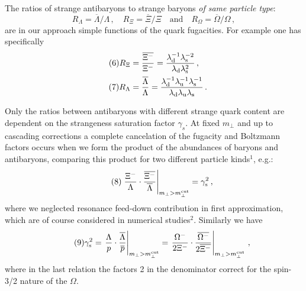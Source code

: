 \begin{mdframed}[linecolor=gray,roundcorner=12pt,backgroundcolor=Dandelion!15,linewidth=1pt,leftmargin=0cm,rightmargin=0cm,topline=true,bottomline=true,skipabove=12pt]
The ratios of strange antibaryons to strange baryons {\it
of same particle type\/}: 
\begin{equation}\tag{5}R_\Lambda=\overline{\Lambda}/\Lambda\,,\quad 
R_\Xi=\overline{\Xi}/\Xi\quad \mbox{and}\quad
R_\Omega=\overline{\Omega}/\Omega\,,\end{equation}
are in our approach simple functions of the quark 
fugacities. For example one has specifically
 \begin{align}\tag{6}
 R_\Xi &= {{\overline{\Xi^-}}\over {\Xi^-}} =
 {{\lambda_{\rm d}^{-1} \lambda_{\rm s}^{-2}} \over
 {\lambda_{\rm d} \lambda_{\rm s}^2}} \, ,
\qquad \label{ratioL}\\
\tag{7} R_\Lambda &= {\overline{\Lambda}\over \Lambda} =
{{\lambda_{\rm d}^{-1} \lambda_{\rm u}^{-1}
    \lambda_{\rm s}^{-1}} \over
 {\lambda_{\rm d} \lambda_{\rm u} \lambda_{\rm s}}} \, . 
\label{ratio}
 \end{align}

Only the ratios between antibaryons with
different strange quark content are dependent on
the strangeness saturation factor $\gamma_s$. 
At fixed $m_\bot$ and up to cascading corrections 
a complete cancelation of the fugacity and Boltzmann 
factors occurs when we form the product of the abundances 
of baryons and antibaryons, comparing this product 
for two different particle kinds$^{1}$, { e.g.}:
 \begin{equation}\tag{8}
 \left. {\Xi^-\over\Lambda}
 \cdot {\overline{\Xi^-}\over \overline{\Lambda}
 }\right\vert_{m_\perp>m_\perp^{\rm cut}} =\gamma_{\rm s}^2 \,, 
 \label{gam1}
 \end{equation}
where we neglected resonance feed-down contribution in first 
approximation, which are of course considered in numerical studies$^{2}$. Similarly we have 
\begin{equation}\tag{9}
 \gamma_{\rm s}^2 = \left.
 {\Lambda\over p} \cdot {\overline{\Lambda}\over \overline p} 
 \right\vert_{m_\perp>m_\perp^{\rm cut}}
   = \left.
 {\Omega^-\over 2\Xi^-} \cdot {\overline{\Omega^-} \over 
     2\overline{\Xi^-}}  
  \right\vert_{m_\perp>m_\perp^{\rm cut}} \, ,
\label{gam3}
 \end{equation}
where in the last relation the factors 2 in the denominator correct
for the spin-3/2 nature of the $\Omega$.



\end{mdframed}
